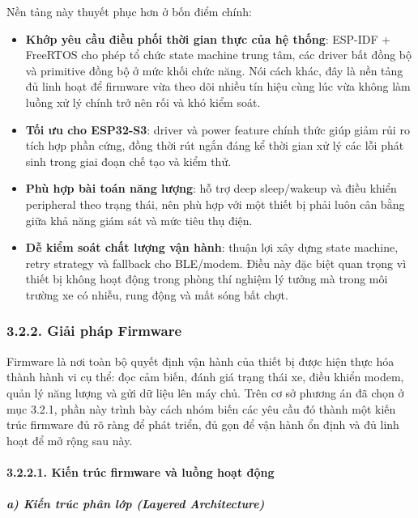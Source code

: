 \documentclass[a4paper]{extarticle}
\providecommand{\tightlist}{%
  \setlength{\itemsep}{0pt}\setlength{\parskip}{0pt}}
\begin{document}
Nền tảng này thuyết phục hơn ở bốn điểm chính:

\begin{itemize}
\tightlist
\item
  \textbf{Khớp yêu cầu điều phối thời gian thực của hệ thống}: ESP-IDF +
  FreeRTOS cho phép tổ chức state machine trung tâm, các driver bất đồng
  bộ và primitive đồng bộ ở mức khối chức năng. Nói cách khác, đây là
  nền tảng đủ linh hoạt để firmware vừa theo dõi nhiều tín hiệu cùng lúc
  vừa không làm luồng xử lý chính trở nên rối và khó kiểm soát.
\item
  \textbf{Tối ưu cho ESP32-S3}: driver và power feature chính thức giúp
  giảm rủi ro tích hợp phần cứng, đồng thời rút ngắn đáng kể thời gian
  xử lý các lỗi phát sinh trong giai đoạn chế tạo và kiểm thử.
\item
  \textbf{Phù hợp bài toán năng lượng}: hỗ trợ deep sleep/wakeup và điều
  khiển peripheral theo trạng thái, nên phù hợp với một thiết bị phải
  luôn cân bằng giữa khả năng giám sát và mức tiêu thụ điện.
\item
  \textbf{Dễ kiểm soát chất lượng vận hành}: thuận lợi xây dựng state
  machine, retry strategy và fallback cho BLE/modem. Điều này đặc biệt
  quan trọng vì thiết bị không hoạt động trong phòng thí nghiệm lý tưởng
  mà trong môi trường xe có nhiễu, rung động và mất sóng bất chợt.
\end{itemize}

\subsubsection{3.2.2. Giải pháp
Firmware}\label{322-giux1ea3i-phuxe1p-firmware}

Firmware là nơi toàn bộ quyết định vận hành của thiết bị được hiện thực
hóa thành hành vi cụ thể: đọc cảm biến, đánh giá trạng thái xe, điều
khiển modem, quản lý năng lượng và gửi dữ liệu lên máy chủ. Trên cơ sở
phương án đã chọn ở mục 3.2.1, phần này trình bày cách nhóm biến các yêu
cầu đó thành một kiến trúc firmware đủ rõ ràng để phát triển, đủ gọn để
vận hành ổn định và đủ linh hoạt để mở rộng sau này.

\paragraph{3.2.2.1. Kiến trúc firmware và luồng hoạt
động}\label{3221-kiux1ebfn-truxfac-firmware-vuxe0-luux1ed3ng-houx1ea1t-ux111ux1ed9ng}

\subparagraph{a) Kiến trúc phân lớp (Layered
Architecture)}\label{a-kiux1ebfn-truxfac-phuxe2n-lux1edbp-layered-architecture}
\end{document}
